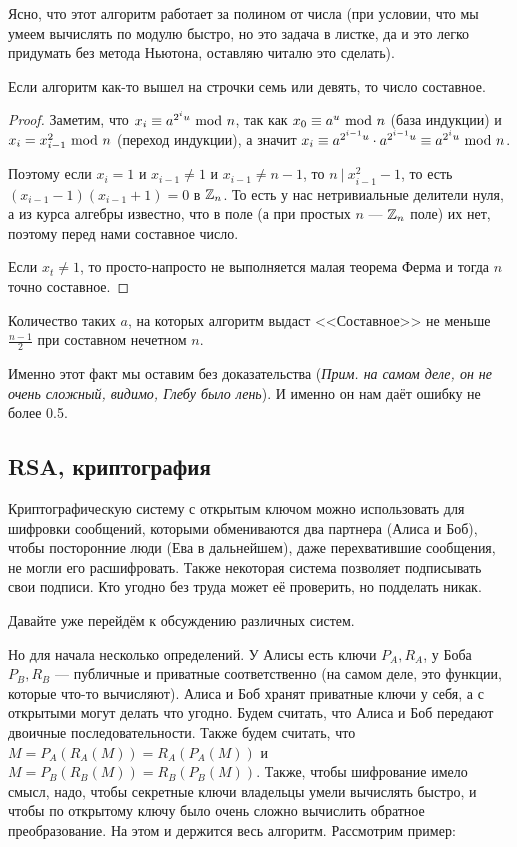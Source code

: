 Ясно, что этот алгоритм работает за полином от числа (при условии, что
мы умеем вычислять по модулю быстро, но это задача в листке, да и это легко 
придумать без метода Ньютона, оставляю читалю это сделать).

\begin{Lemma}
  Если алгоритм как-то вышел на строчки семь или девять, то число
  составное.
\end{Lemma}

\begin{proof}
  Заметим, что $x_i \equiv a^{2^i u} \ \text{mod} \  n$, так как $x_0 \equiv a^{u} \ \text{mod} \  n$
  (база индукции) и 
  $x_i = x_{i - 1}^2 \ \text{mod} \  n$ (переход индукции), а значит $x_i \equiv a^{2^{i -
  1} u} \cdot
  a^{2^{i - 1} u} \equiv a^{2^{i} u} \ \text{mod} \  n$. 

  Поэтому если $x_i = 1$ и $x_{i - 1} \neq 1$ и $x_{i - 1} \neq n - 1$, то 
  $n \ | \ x_{i - 1}^2 - 1$, то есть $(x_{i - 1} - 1)(x_{i - 1} + 1) = 0$ в 
  $\mathbb{Z}_n$.
  То есть у нас нетривиальные делители нуля, а из курса алгебры известно, что в
  поле (а при простых $n$ --- $\mathbb{Z}_n$ поле) их нет, поэтому перед нами составное 
  число.

  Если $x_t \neq 1$, то просто-напросто не выполняется малая теорема Ферма и 
  тогда $n$ точно составное.
\end{proof}

\begin{Lemma}
Количество таких $a$, 
на которых алгоритм выдаст <<Составное>> не меньше $\frac{n - 1}{2}$ при
составном нечетном $n$.
\end{Lemma}

Именно этот факт мы оставим без доказательства ({\it Прим. на самом деле, он не 
очень сложный, видимо, Глебу было лень}).
И именно он нам даёт ошибку не более 0.5.

\subsection{RSA, криптография}

Криптографическую систему с открытым ключом можно использовать для шифровки
сообщений, которыми обмениваются два партнера (Алиса и Боб), чтобы посторонние
люди (Ева в дальнейшем), даже перехватившие сообщения,
не могли его расшифровать. Также некоторая система позволяет подписывать 
свои подписи. Кто угодно без труда может её проверить, но подделать никак.

Давайте уже перейдём к обсуждению различных систем.

Но для начала несколько определений. У Алисы есть 
ключи $P_{A}, R_{A}$, у Боба $P_{B}, R_{B}$ --- 
публичные и приватные соответственно (на самом деле, это функции, которые 
что-то вычисляют). Алиса и Боб хранят приватные ключи у себя,
а с открытыми могут делать что угодно. Будем считать, что Алиса и Боб передают
двоичные последовательности. Также будем считать, что $M = P_{A}(R_{A}(M)) = R_{
A}(P_{A}(M))$ и $M = P_{B}(R_{B}(M)) = R_{B}(P_{B}(M))$. Также, чтобы шифрование
имело смысл, надо, чтобы секретные ключи владельцы умели вычислять быстро, и
чтобы по открытому ключу было очень сложно вычислить обратное преобразование.
На этом и держится весь алгоритм. Рассмотрим пример:

